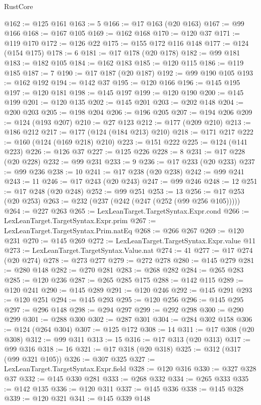 \begin{lexlean}{RustCore}
\begin{coremodule}
@162 := @125 @161
@163 := 5
@166 := @17 @163 (@20 @163)
@167 := @99 @166
@168 := @167 @105
@169 := @162 @168
@170 := @120 @37
@171 := @119 @170
@172 := @126 @22
@175 := @155 @172 @116 @148
@177 := @124 (@154 @175)
@178 := 6
@181 := @17 @178 (@20 @178)
@182 := @99 @181
@183 := @182 @105
@184 := @162 @183
@185 := @120 @115
@186 := @119 @185
@187 := 7
@190 := @17 @187 (@20 @187)
@192 := @99 @190 @105
@193 := @162 @192
@194 := @142 @37
@195 := @120 @166
@196 := @145 @195
@197 := @120 @181
@198 := @145 @197
@199 := @120 @190
@200 := @145 @199
@201 := @120 @135
@202 := @145 @201
@203 := @202 @148
@204 := @200 @203
@205 := @198 @204
@206 := @196 @205
@207 := @194 @206
@209 := @124 (@193 @207)
@210 := @27 @123
@212 := @177 (@209 @210)
@213 := @186 @212
@217 := @177 (@124 (@184 @213) @210)
@218 := @171 @217
@222 := @160 (@124 (@169 @218) @210)
@223 := @151 @222
@225 := @124 (@141 @223)
@226 := @126 @37
@227 := @125 @226
@228 := 8
@231 := @17 @228 (@20 @228)
@232 := @99 @231
@233 := 9
@236 := @17 @233 (@20 @233)
@237 := @99 @236
@238 := 10
@241 := @17 @238 (@20 @238)
@242 := @99 @241
@243 := 11
@246 := @17 @243 (@20 @243)
@247 := @99 @246
@248 := 12
@251 := @17 @248 (@20 @248)
@252 := @99 @251
@253 := 13
@256 := @17 @253 (@20 @253)
@263 := @232 (@237 (@242 (@247 (@252 (@99 @256 @105)))))
@264 := @227 @263
@265 := LexLeanTarget.TargetSyntax.Expr.cond
@266 := LexLeanTarget.TargetSyntax.Expr.prim
@267 := LexLeanTarget.TargetSyntax.Prim.natEq
@268 := @266 @267
@269 := @120 @231
@270 := @145 @269
@272 := LexLeanTarget.TargetSyntax.Expr.value @11
@273 := LexLeanTarget.TargetSyntax.Value.nat
@274 := 41
@277 := @17 @274 (@20 @274)
@278 := @273 @277
@279 := @272 @278
@280 := @145 @279
@281 := @280 @148
@282 := @270 @281
@283 := @268 @282
@284 := @265 @283
@285 := @120 @236
@287 := @265 @285 @175
@288 := @142 @115
@289 := @120 @241
@290 := @145 @289
@291 := @120 @246
@292 := @145 @291
@293 := @120 @251
@294 := @145 @293
@295 := @120 @256
@296 := @145 @295
@297 := @296 @148
@298 := @294 @297
@299 := @292 @298
@300 := @290 @299
@301 := @288 @300
@302 := @287 @301
@304 := @284 @302 @158
@306 := @124 (@264 @304)
@307 := @125 @172
@308 := 14
@311 := @17 @308 (@20 @308)
@312 := @99 @311
@313 := 15
@316 := @17 @313 (@20 @313)
@317 := @99 @316
@318 := 16
@321 := @17 @318 (@20 @318)
@325 := @312 (@317 (@99 @321 @105))
@326 := @307 @325
@327 := LexLeanTarget.TargetSyntax.Expr.field
@328 := @120 @316
@330 := @327 @328 @37
@332 := @145 @330 @281
@333 := @268 @332
@334 := @265 @333
@335 := @142 @135
@336 := @120 @311
@337 := @145 @336
@338 := @145 @328
@339 := @120 @321
@341 := @145 @339 @148

\end{coremodule}
\end{lexlean}
